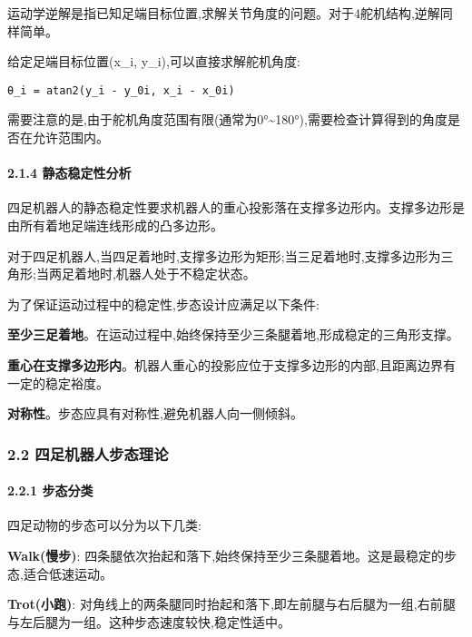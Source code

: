 \documentclass[
]{article}
\begin{document}
运动学逆解是指已知足端目标位置,求解关节角度的问题。对于4舵机结构,逆解同样简单。

给定足端目标位置(x\_i, y\_i),可以直接求解舵机角度:

\begin{verbatim}
θ_i = atan2(y_i - y_0i, x_i - x_0i)
\end{verbatim}

需要注意的是,由于舵机角度范围有限(通常为0°\textasciitilde180°),需要检查计算得到的角度是否在允许范围内。

\hypertarget{ux9759ux6001ux7a33ux5b9aux6027ux5206ux6790}{%
\paragraph{2.1.4
静态稳定性分析}\label{ux9759ux6001ux7a33ux5b9aux6027ux5206ux6790}}

四足机器人的静态稳定性要求机器人的重心投影落在支撑多边形内。支撑多边形是由所有着地足端连线形成的凸多边形。

对于四足机器人,当四足着地时,支撑多边形为矩形;当三足着地时,支撑多边形为三角形;当两足着地时,机器人处于不稳定状态。

为了保证运动过程中的稳定性,步态设计应满足以下条件:

\textbf{至少三足着地}。在运动过程中,始终保持至少三条腿着地,形成稳定的三角形支撑。

\textbf{重心在支撑多边形内}。机器人重心的投影应位于支撑多边形的内部,且距离边界有一定的稳定裕度。

\textbf{对称性}。步态应具有对称性,避免机器人向一侧倾斜。

\hypertarget{ux56dbux8db3ux673aux5668ux4ebaux6b65ux6001ux7406ux8bba}{%
\subsubsection{2.2
四足机器人步态理论}\label{ux56dbux8db3ux673aux5668ux4ebaux6b65ux6001ux7406ux8bba}}

\hypertarget{ux6b65ux6001ux5206ux7c7b}{%
\paragraph{2.2.1 步态分类}\label{ux6b65ux6001ux5206ux7c7b}}

四足动物的步态可以分为以下几类:

\textbf{Walk(慢步)}:
四条腿依次抬起和落下,始终保持至少三条腿着地。这是最稳定的步态,适合低速运动。

\textbf{Trot(小跑)}:
对角线上的两条腿同时抬起和落下,即左前腿与右后腿为一组,右前腿与左后腿为一组。这种步态速度较快,稳定性适中。
\end{document}
